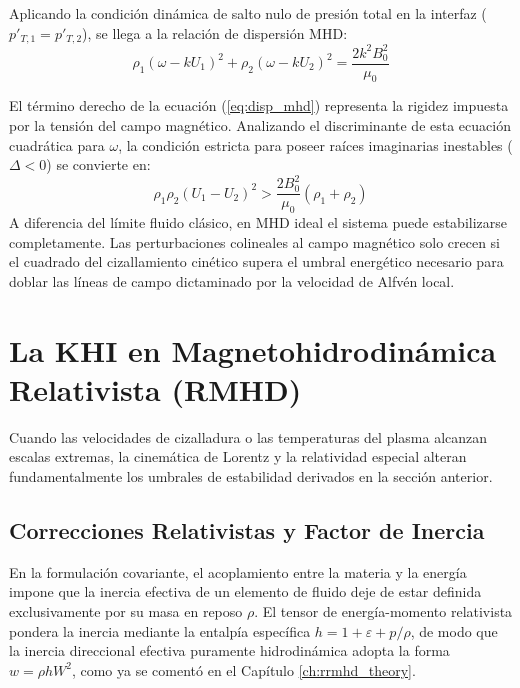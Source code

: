 Aplicando la condición dinámica de salto nulo de presión total en la interfaz ($p'_{T,1} = p'_{T,2}$), se llega a la relación de dispersión MHD:
\begin{equation}
    \rho_1 (\omega - k U_1)^2 + \rho_2 (\omega - k U_2)^2 = \frac{2 k^2 B_0^2}{\mu_0}
    \label{eq:disp_mhd}
\end{equation}

El término derecho de la ecuación (\ref{eq:disp_mhd}) representa la rigidez impuesta por la tensión del campo magnético. Analizando el discriminante de esta ecuación cuadrática para $\omega$, la condición estricta para poseer raíces imaginarias inestables ($\Delta < 0$) se convierte en:
\begin{equation}
    \rho_1 \rho_2 (U_1 - U_2)^2 > \frac{2 B_0^2}{\mu_0} (\rho_1 + \rho_2)
\end{equation}
A diferencia del límite fluido clásico, en MHD ideal el sistema puede estabilizarse completamente. Las perturbaciones colineales al campo magnético solo crecen si el cuadrado del cizallamiento cinético supera el umbral energético necesario para doblar las líneas de campo dictaminado por la velocidad de Alfvén local.

\section[La KHI en RMHD]{La KHI en Magnetohidrodinámica Relativista (RMHD)}
\label{sec:khi_rmhd}

\primerparrafo Cuando las velocidades de cizalladura o las temperaturas del plasma alcanzan escalas extremas, la cinemática de Lorentz y la relatividad especial alteran fundamentalmente los umbrales de estabilidad derivados en la sección anterior.

\subsection{Correcciones Relativistas y Factor de Inercia}
\label{subsec:khi_rmhd_rel}

\primerparrafo En la formulación covariante, el acoplamiento entre la materia y la energía impone que la inercia efectiva de un elemento de fluido deje de estar definida exclusivamente por su masa en reposo $\rho$. El tensor de energía-momento relativista pondera la inercia mediante la entalpía específica $h = 1 + \varepsilon + p/\rho$, de modo que la inercia direccional efectiva puramente hidrodinámica adopta la forma $w = \rho h W^2$, como ya se comentó en el Capítulo \ref{ch:rrmhd_theory}.

